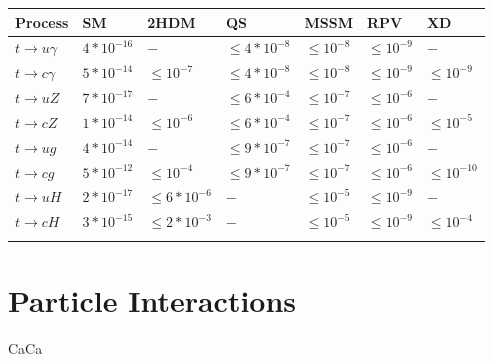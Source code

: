 \begin{table}[]
\begin{tabular}{lllllll}
 \hhline{=======}
Process                                    & SM                        & 2HDM                   & QS                           & MSSM                   & RPV                          & XD                                 \\   \hline 
$t\rightarrow u\gamma $ &    $ 4*10^{-16} $        & $ -  $                   & $ \leq 4*10^{-8} $   & $ \leq 10^{-8} $ & $ \leq 10^{-9} $      &  $- $                                             \\
$t\rightarrow c\gamma $ &    $ 5*10^{-14} $        & $ \leq 10^{-7}   $ & $ \leq 4*10^{-8} $ & $ \leq 10^{-8} $ & $ \leq 10^{-9} $     & $ \leq 10^{-9}  $\\ \hline
$t\rightarrow u Z                    $ & $ 7*10^{-17} $  & $ -                     $ & $ \leq 6*10^{-4} $ & $ \leq 10^{-7} $ & $ \leq 10^{-6} $     & $ -  $                                             \\
$t\rightarrow c Z                    $ & $ 1*10^{-14} $  & $ \leq 10^{-6}   $ & $ \leq 6*10^{-4} $ & $ \leq 10^{-7} $ & $ \leq 10^{-6} $     & $ \leq 10^{-5} $ \\
$t\rightarrow u g                    $ & $ 4*10^{-14} $  & $ -                     $ & $ \leq 9*10^{-7} $ & $ \leq 10^{-7} $ & $ \leq 10^{-6} $     & $ -  $                                             \\
$t\rightarrow c g                    $ & $ 5*10^{-12} $  & $ \leq 10^{-4}   $  & $ \leq 9*10^{-7} $ & $ \leq 10^{-7} $ & $ \leq 10^{-6} $    & $ \leq 10^{-10} $ \\
$t\rightarrow u H                    $ & $ 2*10^{-17} $  & $ \leq 6*10^{-6} $ & $ -                      $ & $ \leq 10^{-5} $ & $ \leq 10^{-9} $     & $ -    $                                           \\
$t\rightarrow c H                    $ & $ 3*10^{-15} $  & $ \leq 2*10^{-3} $ & $ -                      $ & $ \leq 10^{-5} $ & $ \leq 10^{-9} $     & $ \leq 10^{-4} $ \\
\hhline{=======}
\end{tabular}
\end{table}

\section{Particle Interactions}
CaCa


